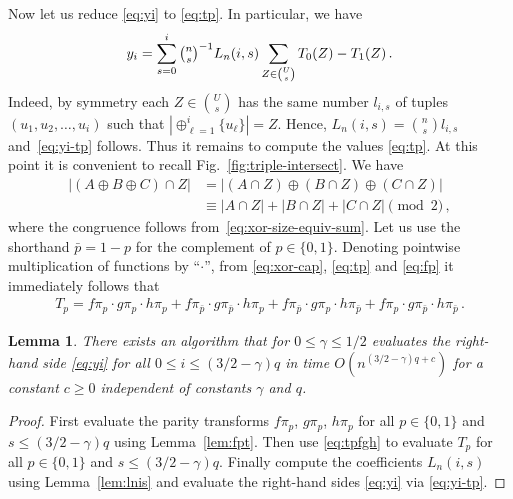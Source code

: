 \documentclass{amsart}
\newtheorem{Lem}{Lemma}
\begin{document}
Now let us reduce \eqref{eq:yi} to \eqref{eq:tp}. In particular,
we have 
\begin{equation}
\label{eq:yi-tp}
y_i=\sum_{s=0}^i \tbinom{n}{s}^{-1}L_n(i,s)\sum_{Z\in\binom{U}{s}}T_0(Z)-T_1(Z)\,.
\end{equation}
Indeed, by symmetry each $Z\in{U\choose s}$ has the same number $l_{i,s}$ of tuples $(u_1,u_2,\ldots,u_i)$ such that $|\!\oplus_{\ell=1}^i\{u_{\ell}\}|=Z$. Hence, $L_n(i,s)={n \choose s}l_{i,s}$ and~\eqref{eq:yi-tp} follows.
Thus it remains to compute the values \eqref{eq:tp}.
At this point it is convenient to recall Fig.~\ref{fig:triple-intersect}.
We have
\begin{equation}
\label{eq:xor-cap}
\begin{split} 
\bigl|(A\oplus B\oplus C)\cap Z\bigr|
&= 
|(A \cap Z) \oplus(B \cap Z) \oplus(C \cap Z)| \\
&\equiv
|A\cap Z|
+|B\cap Z|
+|C\cap Z|\pmod 2\,,
\end{split}
\end{equation}
where the congruence follows from~\eqref{eq:xor-size-equiv-sum}.
Let us use the shorthand $\bar p=1-p$ for the complement of $p\in\{0,1\}$.
Denoting pointwise multiplication of functions by ``$\cdot$'',
from \eqref{eq:xor-cap}, \eqref{eq:tp} and \eqref{eq:fp} it immediately
follows that
\begin{equation}
\label{eq:tpfgh}
\begin{split}
T_p
=f\pi_p\cdot g\pi_p\cdot h\pi_p
+f\pi_{\bar p}\cdot g\pi_{\bar p}\cdot h\pi_p
+f\pi_{\bar p}\cdot g\pi_p\cdot h\pi_{\bar p}
+f\pi_p\cdot g\pi_{\bar p}\cdot h\pi_{\bar p}\,.
\end{split}
\end{equation}

\begin{Lem}
\label{lem:yi}
There exists an algorithm that for $0\leq\gamma\leq 1/2$ evaluates
the right-hand side \eqref{eq:yi} for all $0\leq i\leq(3/2-\gamma)q$
in time $O(n^{(3/2-\gamma)q+c})$ for a constant $c\geq 0$ 
independent of constants $\gamma$ and $q$.
\end{Lem}
\begin{proof}
First evaluate the parity transforms $f\pi_p$, $g\pi_p$, $h\pi_p$ 
for all $p\in\{0,1\}$ and $s\leq (3/2-\gamma)q$ using Lemma~\ref{lem:fpt}.
Then use \eqref{eq:tpfgh} to evaluate $T_p$ 
for all $p\in\{0,1\}$ and $s\leq (3/2-\gamma)q$. Finally
compute the coefficients $L_n(i,s)$ using Lemma~\ref{lem:lnis} 
and evaluate the right-hand sides \eqref{eq:yi} via \eqref{eq:yi-tp}.
\end{proof}
\end{document}
